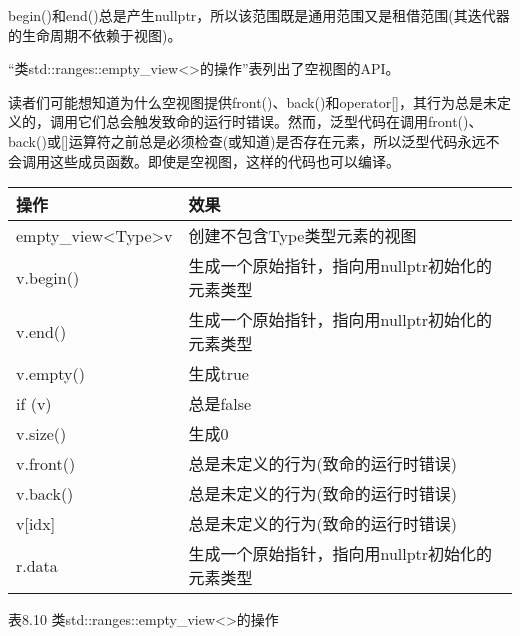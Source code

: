 begin()和end()总是产生nullptr，所以该范围既是通用范围又是租借范围(其迭代器的生命周期不依赖于视图)。


“类std::ranges::empty\_view<>的操作”表列出了空视图的API。

读者们可能想知道为什么空视图提供front()、back()和operator[]，其行为总是未定义的，调用它们总会触发致命的运行时错误。然而，泛型代码在调用front()、back()或[]运算符之前总是必须检查(或知道)是否存在元素，所以泛型代码永远不会调用这些成员函数。即使是空视图，这样的代码也可以编译。

\begin{longtable}[c]{|l|l|}
\hline
\textbf{操作} & \textbf{效果}                                                       \\ \hline
\endfirsthead
%
\endhead
%
empty\_view\textless{}Type\textgreater v & 创建不包含Type类型元素的视图                          \\ \hline
v.begin()                                & 生成一个原始指针，指向用nullptr初始化的元素类型 \\ \hline
v.end()            & 生成一个原始指针，指向用nullptr初始化的元素类型 \\ \hline
v.empty()          & 生成true                                                           \\ \hline
if (v)             & 总是false                                                          \\ \hline
v.size()           & 生成0                                                              \\ \hline
v.front()          & 总是未定义的行为(致命的运行时错误)                        \\ \hline
v.back()           & 总是未定义的行为(致命的运行时错误)                        \\ \hline
v{[}idx{]}         & 总是未定义的行为(致命的运行时错误)                        \\ \hline
r.data             & 生成一个原始指针，指向用nullptr初始化的元素类型 \\ \hline
\end{longtable}

\begin{center}
表8.10 类std::ranges::empty\_view<>的操作
\end{center}

